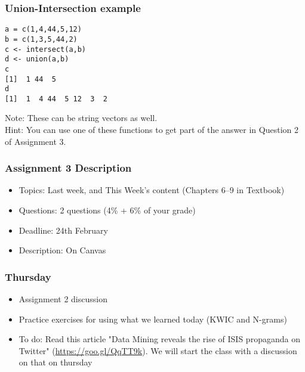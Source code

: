 \documentclass{beamer}
\begin{document}
\begin{frame}[fragile]
\frametitle{Union-Intersection example}
\begin{verbatim}
a = c(1,4,44,5,12)
b = c(1,3,5,44,2)
c <- intersect(a,b)
d <- union(a,b)
c
[1]  1 44  5
d
[1]  1  4 44  5 12  3  2
\end{verbatim}
Note: These can be string vectors as well. \\
Hint: You can use one of these functions to get part of the answer in Question 2 of Assignment 3.
\end{frame}

\begin{frame}[fragile]
\frametitle{Assignment 3 Description}
\begin{itemize}
\item Topics: Last week, and This Week's content (Chapters 6--9 in Textbook)
\item Questions: 2 questions (4\% + 6\% of your grade)
\item Deadline: 24th February
\item Description: On Canvas
\end{itemize}
\end{frame}

\begin{frame}
\frametitle{Thursday}
\begin{itemize}
\item Assignment 2 discussion
\item Practice exercises for using what we learned today (KWIC and N-grams)
\item To do: Read this article "Data Mining reveals the rise of ISIS propaganda on Twitter" (\url{https://goo.gl/QqTT9k}). We will start the class with a discussion on that on thursday
\end{itemize}
\end{frame}
\end{document}
